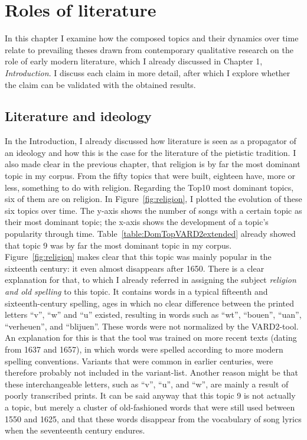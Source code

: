 \chapter{Roles of literature}

In this chapter I examine how the composed topics and their dynamics over time relate to prevailing theses drawn from contemporary qualitative research on the role of early modern literature, which I already discussed in Chapter 1, \textit{Introduction}. I discuss each claim in more detail, after which I explore whether the claim can be validated with the obtained results.

\section{Literature and ideology}
In the Introduction, I already discussed how literature is seen as a propagator of an ideology and how this is the case for the literature of the pietistic tradition. I also made clear in the previous chapter, that religion is by far the most dominant topic in my corpus. From the fifty topics that were built, eighteen have, more or less, something to do with religion. Regarding the Top10 most dominant topics, six of them are on religion. In Figure~\ref{fig:religion}, I plotted the evolution of these six topics over time. The y-axis shows the number of songs with a certain topic as their most dominant topic; the x-axis shows the development of a topic's popularity through time. Table~\ref{table:DomTopVARD2extended} already showed that topic 9 was by far the most dominant topic in my corpus. Figure~\ref{fig:religion} makes clear that this topic was mainly popular in the sixteenth century: it even almost disappears after 1650. There is a clear explanation for that, to which I already referred in assigning the subject \textit{religion and old spelling} to this topic. It contains words in a typical fifteenth and sixteenth-century spelling, ages in which no clear difference between the printed letters \enquote{v}, \enquote{w} and \enquote{u} existed, resulting in words such as \enquote{wt}, \enquote{bouen}, \enquote{uan}, \enquote{verheuen}, and \enquote{blijuen}. These words were not normalized by the VARD2-tool. An explanation for this is that the tool was trained on more recent texts (dating from 1637 and 1657), in which words were spelled according to more modern spelling conventions. Variants that were common in earlier centuries, were therefore probably not included in the variant-list. Another reason might be that these interchangeable letters, such as \enquote{v}, \enquote{u}, and \enquote{w}, are mainly a result of poorly transcribed prints. It can be said anyway that this topic 9 is not actually a topic, but merely a cluster of old-fashioned words that were still used between 1550 and 1625, and that these words disappear from the vocabulary of song lyrics when the seventeenth century endures.

